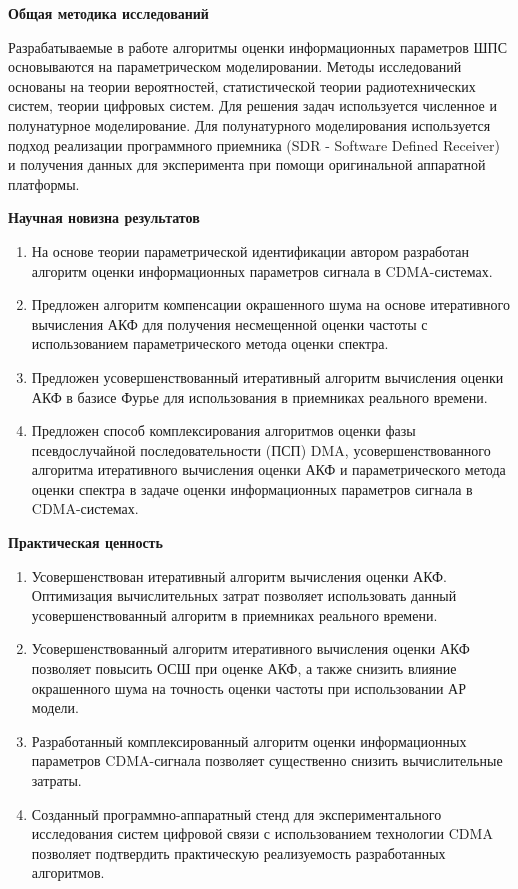 {\bf{Общая методика исследований}}

Разрабатываемые в работе алгоритмы оценки информационных параметров ШПС основываются на параметрическом моделировании. Методы исследований основаны на теории вероятностей,
статистической теории радиотехнических систем, теории цифровых систем. Для решения задач используется численное и полунатурное моделирование. Для полунатурного моделирования
используется подход реализации программного приемника (SDR - Software Defined Receiver) и получения данных для эксперимента при помощи оригинальной аппаратной платформы.

{\bf{Научная новизна результатов}}
\begin{enumerate}
	\item {На основе теории параметрической идентификации автором разработан алгоритм оценки информационных параметров сигнала в CDMA-системах.}
	\item {Предложен алгоритм компенсации окрашенного шума на основе итеративного вычисления АКФ для получения несмещенной оценки частоты с использованием параметрического метода оценки спектра.}
	\item {Предложен усовершенствованный итеративный алгоритм вычисления оценки АКФ в базисе Фурье для использования в приемниках реального времени.}
	\item {Предложен способ комплексирования алгоритмов оценки фазы псевдослучайной последовательности (ПСП) DMA, усовершенствованного алгоритма итеративного вычисления оценки АКФ и параметрического метода оценки спектра в задаче оценки информационных параметров сигнала в CDMA-системах.}
\end{enumerate}

{\bf{Практическая ценность}}
\begin{enumerate}
	\item {Усовершенствован итеративный алгоритм вычисления оценки АКФ. Оптимизация вычислительных затрат позволяет использовать данный усовершенствованный алгоритм в приемниках реального времени.}
	\item {Усовершенствованный алгоритм итеративного вычисления оценки АКФ позволяет повысить ОСШ при оценке АКФ, а также снизить влияние окрашенного шума на точность оценки частоты при использовании АР модели.}
	\item {Разработанный комплексированный алгоритм оценки информационных параметров CDMA-сигнала позволяет существенно снизить вычислительные затраты.}
	\item {Созданный программно-аппаратный стенд для экспериментального исследования систем цифровой связи с использованием технологии CDMA позволяет подтвердить практическую реализуемость разработанных алгоритмов.}
\end{enumerate}

